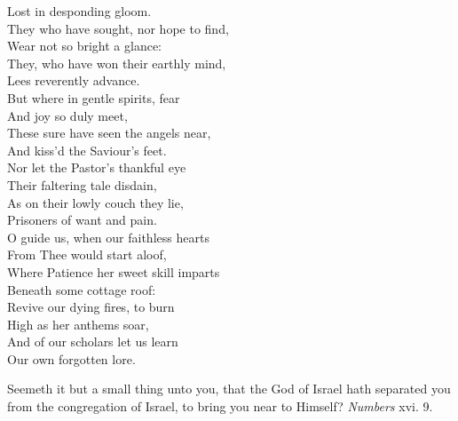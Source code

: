  Lost in desponding gloom. \\
  They who have sought, nor hope to find, \\
 Wear not so bright a glance: \\
 They, who have won their earthly mind, \\
 Lees reverently advance. \\
  But where in gentle spirits, fear \\
 And joy so duly meet, \\
 These sure have seen the angels near, \\
 And kiss’d the Saviour’s feet. \\
  Nor let the Pastor’s thankful eye \\
 Their faltering tale disdain, \\
 As on their lowly couch they lie, \\
 Prisoners of want and pain. \\
  O guide us, when our faithless hearts \\
 From Thee would start aloof, \\
 Where Patience her sweet skill imparts \\
 Beneath some cottage roof: \\
  Revive our dying fires, to burn \\
 High as her anthems soar, \\
 And of our scholars let us learn \\
 Our own forgotten lore.\\


Seemeth it but a small thing unto you, that the God of Israel hath separated you from the congregation of Israel, to bring you near to Himself? \emph{Numbers} xvi. 9.

